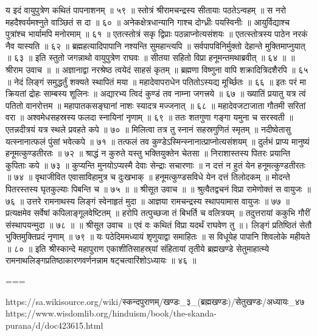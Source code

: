 य इदं वायुपुत्रेण कथितं पापनाशनम् ॥ ५९ ॥
स्तोत्रं श्रीरामचन्द्रस्य सीतायाः पठतेऽन्वहम् ॥
स नरो महदैश्वर्यमश्नुते वाञ्छितं स दा ॥ ६० ॥
अनेकक्षेत्रधान्यानि गाश्च दोग्ध्रीः पयस्विनीः ॥
आयुर्विद्याश्च पुत्रांश्च भार्यामपि मनोरमाम् ॥ ६१ ॥
एतत्स्तोत्रं सकृ द्विप्राः पठन्नाप्नोत्यसंशयः ॥
एतत्स्तोत्रस्य पाठेन नरकं नैव यास्यति ॥ ६२ ॥
ब्रह्महत्यादिपापानि नश्यन्ति सुमहान्त्यपि ॥
सर्वपापविनिर्मुक्तो देहान्ते मुक्तिमाप्नुयात् ॥ ६३ ॥
इति स्तुतो जगन्नाथो वायुपुत्रेण राघवः ॥
सीतया सहितो विप्रा हनूमन्तमथाब्रवीत् ॥ ६४ ॥
॥ श्रीराम उवाच ॥ ॥
अज्ञानाद्वा नरश्रेष्ठ त्वयेदं साहसं कृतम् ॥
ब्रह्मणा विष्णुना वापि शक्रादित्रिदशैरपि ॥ ६५ ॥
नेदं लिङ्गं समुद्धर्तुं शक्यते स्थापितं मया ॥
महादेवापराधेन पतितोऽस्यद्य मूर्च्छितः ॥ ६६ ॥
इतः परं मा क्रियतां द्रोहः साम्बस्य शूलिनः ॥
अद्यारभ्य त्विदं कुण्डं तव नाम्ना जगत्त्रये ॥ ६७ ॥
ख्यातिं प्रयातु यत्र त्वं पतितो वानरोत्तम ॥
महापातकसङ्घानां नाशः स्यादत्र मज्जनात् ॥ ६८ ॥
महादेवजटाजाता गौतमी सरितां वरा ॥
अश्वमेधसहस्रस्य फलदा स्नायिनां नृणाम् ॥ ६९ ॥
ततः शतगुणा गङ्गा यमुना च सरस्वती ॥
एतन्नदीत्रयं यत्र स्थले प्रवहते कपे ॥ ७० ॥
मिलित्वा तत्र तु स्नानं सहस्रगुणितं स्मृतम् ॥
नदीष्वेतासु यत्स्नानात्फलं पुंसां भवेत्कपे ॥ ७१ ॥
तत्फलं तव कुण्डेऽस्मिन्स्नानात्प्राप्नोत्यसंशयम् ॥
दुर्लभं प्राप्य मानुष्यं हनूमत्कुण्डतीरतः ॥ ७२ ॥
श्राद्धं न कुरुते यस्तु भक्तियुक्तेन चेतसा ॥
निराशास्तस्य पितरः प्रयान्ति कुपिताः कपे ॥ ७३ ॥
कुप्यन्ति मुनयोऽप्यस्मै देवाः सेन्द्राः सचारणाः ॥
न दत्तं न हुतं येन हनूमत्कुण्डतीरतः ॥ ७४ ॥
वृथाजीवित एवासाविहामुत्र च दुःखभाक् ॥
हनूमत्कुण्डसविधे येन दत्तं तिलोदकम् ॥
मोदन्ते पितरस्तस्य घृतकुल्याः पिबन्ति च ॥ ७५ ॥
॥ श्रीसूत उवाच ॥ ॥
श्रुत्वैतद्वचनं विप्रा रामेणोक्तं स वायुजः ॥ ७६ ॥
उत्तरे रामनाथस्य लिङ्गं स्वेनाहृतं मुदा ॥
आज्ञया रामचन्द्रस्य स्थापयामास वायुजः ॥ ७७ ॥
प्रत्यक्षमेव सर्वेषां कपिलाङ्गूलवेष्टितम् ॥
हरोपि तत्पुच्छजा तं बिभर्ति च वलित्रयम् ॥
तदुत्तरायां ककुभि गौरीं संस्थापयन्मुदा ॥ ७८ ॥
॥ श्रीसूत उवाच ॥
एवं वः कथितं विप्रा यदर्थं राघवेण तु ॥।
लिङ्गं प्रतिष्ठितं सेतौ भुक्तिमुक्तिप्रदं नृणाम् ॥ ७९ ॥
यः पठेदिममध्यायं शृणुयाद्वा समाहितः ॥
स विधूयेह पापानि शिवलोके महीयते ॥ ८० ॥
इति श्रीस्कान्दे महापुराण एकाशीतिसाहस्र्यां संहितायां तृतीये ब्रह्मखण्डे सेतुमाहात्म्ये रामनाथलिङ्गप्रतिष्ठाकारणवर्णनन्नाम षट्चत्वारिंशोऽध्यायः ॥ ४६ ॥

===

https://sa.wikisource.org/wiki/स्कन्दपुराणम्/खण्डः_३_(ब्रह्मखण्डः)/सेतुखण्डः/अध्यायः_४७
https://www.wisdomlib.org/hinduism/book/the-skanda-purana/d/doc423615.html

